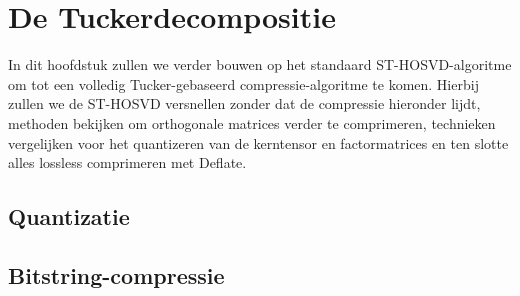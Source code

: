 \chapter{De Tuckerdecompositie}
\label{hoofdstuk:tucker}

In dit hoofdstuk zullen we verder bouwen op het standaard ST-HOSVD-algoritme om tot een volledig Tucker-gebaseerd compressie-algoritme te komen. Hierbij zullen we de ST-HOSVD versnellen zonder dat de compressie hieronder lijdt, methoden bekijken om orthogonale matrices verder te comprimeren, technieken vergelijken voor het quantizeren van de kerntensor en factormatrices en ten slotte alles lossless comprimeren met Deflate.




\section{Quantizatie}

\section{Bitstring-compressie}